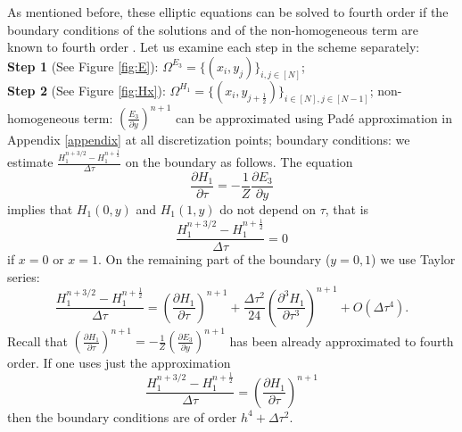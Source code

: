\documentclass[12pt,reqno]{amsart}
\theoremstyle{definition}
\numberwithin{equation}{section}
\def\Gw{\Omega}     \def\Gx{\Xi}         \def\Gy{\Psi}
\begin{document}
	As mentioned before, these  elliptic equations  can be solved  to fourth order   if the boundary conditions of the solutions and of the non-homogeneous term are known to fourth order \cite{singer_turkel}.
	Let us examine each step in the scheme separately:\\[1mm]
	{\bf Step 1 } (See Figure \ref{fig:E}):  	$\Gw^{E_3}=\{(x_i,y_j)\}_{i,j\in [N]}$;
\\[1mm]
	{\bf Step 2} (See Figure \ref{fig:Hx}): 
 $\Gw^{H_1}=\{(x_i,y_{j+\frac{1}{2}})\}_{i\in [N],j\in [N-1]}$; 
	non-homogeneous term:  
	$\left (\frac{E_3}{\partial y}\right)^{n+1} $
	can be approximated  using Pad\'e approximation  in Appendix \ref{appendix} at all discretization points;
	boundary conditions:
	we  estimate 
	$\frac{H_1^{n+3/2}-H_1^{n+\frac{1}{2}}}{\Delta \tau}$ on the boundary as follows.
	The equation  
	$$
	\frac{\partial H_1}{\partial \tau}=-\frac{1}{Z}\frac{\partial E_3}{\partial y}
	$$
	implies that $H_1(0,y)$ and $H_1(1,y)$ do not depend on $\tau$, that is 
	$$\frac{H_1^{n+3/2}-H_1^{n+\frac{1}{2}}}{\Delta \tau}=0$$ if $x=0$ or $x=1$.
	On the remaining part of the boundary ($y=0,1$)  we use Taylor series:
	$$
	\frac{	H_1^{n+3/2}-H_1^{n+\frac{1}{2}}}{\Delta \tau}=
	\left(\frac{\partial H_1}{\partial \tau}\right)^{n+1}+
	\frac{\Delta \tau^2}{24}\left(\frac{\partial^3 H_1}{\partial \tau^3}\right)^{n+1}+O(\Delta \tau^4).
	$$
	Recall that
	$\left(\frac{\partial H_1}{\partial \tau}\right)^{n+1}=-\frac{1}{Z}\left(\frac{\partial E_3}{\partial y}\right)^{n+1}$ has been already approximated to fourth order. 
	If one uses just the approximation 
	$$
	\frac{	H_1^{n+3/2}-H_1^{n+\frac{1}{2}}}{\Delta \tau}=
	\left(\frac{\partial H_1}{\partial \tau}\right)^{n+1}
	$$
	then the boundary conditions are of order $h^4+\Delta \tau^2$.
	
\end{document}
